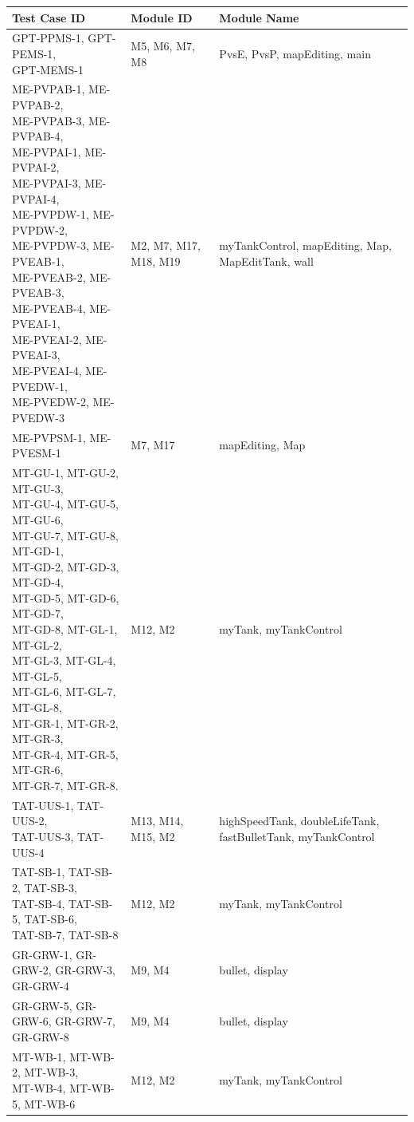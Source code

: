 \documentclass[12pt, titlepage]{article}
\begin{document}
\begin{table}[ht]
\begin{tabular}{|p{7cm}|p{3cm}|p{3cm}|}
 \hline
 Test Case ID & Module ID & Module Name\\
 \hline
 \makecell[l]{GPT-PPMS-1, GPT-PEMS-1,\\ GPT-MEMS-1} & M5, M6, M7, M8 & PvsE, PvsP, mapEditing, main\\ 
 \hline
 \makecell[l]{ME-PVPAB-1, ME-PVPAB-2,\\ ME-PVPAB-3, ME-PVPAB-4,\\ ME-PVPAI-1, ME-PVPAI-2,\\ ME-PVPAI-3, ME-PVPAI-4,\\ ME-PVPDW-1, ME-PVPDW-2,\\ ME-PVPDW-3, ME-PVEAB-1,\\ ME-PVEAB-2, ME-PVEAB-3,\\ ME-PVEAB-4, ME-PVEAI-1,\\ ME-PVEAI-2, ME-PVEAI-3,\\ ME-PVEAI-4, ME-PVEDW-1,\\ ME-PVEDW-2, ME-PVEDW-3} & M2, M7, M17, M18, M19 & myTankControl, mapEditing, Map, MapEditTank, wall\\
 \hline
 ME-PVPSM-1, ME-PVESM-1 & M7, M17 & mapEditing, Map\\
 \hline
 \makecell[l]{MT-GU-1, MT-GU-2, MT-GU-3,\\ MT-GU-4, MT-GU-5, MT-GU-6,\\ MT-GU-7, MT-GU-8, MT-GD-1,\\ MT-GD-2, MT-GD-3, MT-GD-4,\\ MT-GD-5, MT-GD-6, MT-GD-7,\\ MT-GD-8, MT-GL-1, MT-GL-2,\\ MT-GL-3, MT-GL-4, MT-GL-5,\\ MT-GL-6, MT-GL-7, MT-GL-8,\\ MT-GR-1, MT-GR-2, MT-GR-3,\\ MT-GR-4, MT-GR-5, MT-GR-6,\\ MT-GR-7, MT-GR-8.} & M12, M2 & myTank, myTankControl\\
 \hline
 \makecell[l]{TAT-UUS-1, TAT-UUS-2,\\ TAT-UUS-3, TAT-UUS-4} & M13, M14, M15, M2 & highSpeedTank, doubleLifeTank, fastBulletTank, myTankControl\\
\hline
 \makecell[l]{TAT-SB-1, TAT-SB-2, TAT-SB-3,\\ TAT-SB-4, TAT-SB-5, TAT-SB-6,\\ TAT-SB-7, TAT-SB-8} & M12, M2 & myTank, myTankControl\\
  \hline
 \makecell[l]{GR-GRW-1, GR-GRW-2, GR-GRW-3,\\ GR-GRW-4} & M9, M4 & bullet, display\\
  \hline
  \makecell[l]{GR-GRW-5, GR-GRW-6, GR-GRW-7,\\ GR-GRW-8} & M9, M4 & bullet, display\\
 \hline
 \makecell[l]{MT-WB-1, MT-WB-2, MT-WB-3,\\MT-WB-4, MT-WB-5, MT-WB-6} & M12, M2 & myTank, myTankControl\\
  \hline
   \end{tabular}
\end{table}
\end{document}
